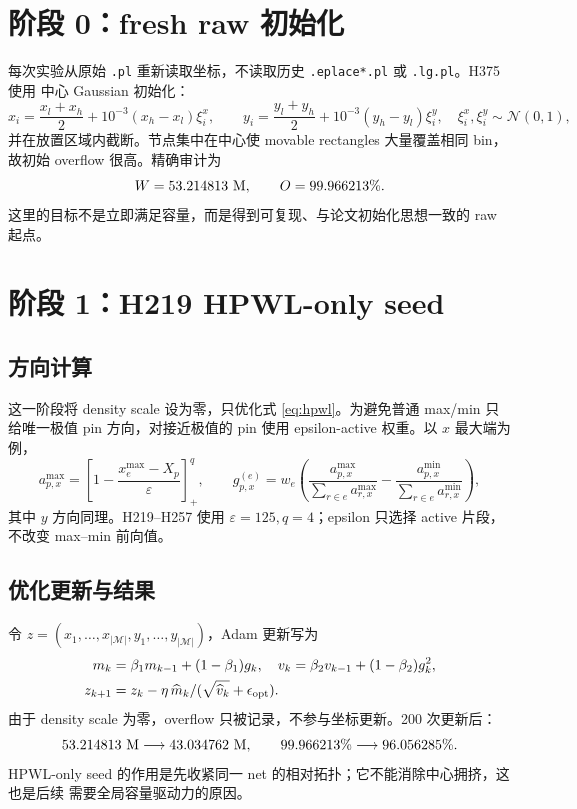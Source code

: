 \documentclass[UTF8,11pt,a4paper]{ctexart}
\newcommand{\mov}{\mathcal{M}}
\newcommand{\clip}[1]{\left[#1\right]_+}
\begin{document}
\section{阶段 0：fresh raw 初始化}

每次实验从原始 \texttt{.pl} 重新读取坐标，不读取历史 \texttt{.eplace*.pl} 或
\texttt{.lg.pl}。H375 使用
中心 Gaussian 初始化：
\begin{equation}
 x_i=\frac{x_l+x_h}{2}+10^{-3}(x_h-x_l)\xi_i^x,
 \qquad
 y_i=\frac{y_l+y_h}{2}+10^{-3}(y_h-y_l)\xi_i^y,
 \quad \xi_i^x,\xi_i^y\sim\mathcal{N}(0,1),
 \label{eq:init}
\end{equation}
并在放置区域内截断。节点集中在中心使 movable rectangles 大量覆盖相同 bin，故初始
overflow 很高。精确审计为
\[
 W=53.214813\ {\rm M},\qquad O=99.966213\%.
\]
这里的目标不是立即满足容量，而是得到可复现、与论文初始化思想一致的 raw 起点。

\section{阶段 1：H219 HPWL-only seed}

\subsection{方向计算}
这一阶段将 density scale 设为零，只优化式 \eqref{eq:hpwl}。为避免普通 max/min 只
给唯一极值 pin 方向，对接近极值的 pin 使用 epsilon-active 权重。以 $x$ 最大端为例，
\begin{equation}
 a_{p,x}^{\max}=\clip{1-\frac{x_e^{\max}-X_p}{\varepsilon}}^q,
 \qquad
 g_{p,x}^{(e)}=w_e\left(
 \frac{a_{p,x}^{\max}}{\sum_{r\in e}a_{r,x}^{\max}}-
 \frac{a_{p,x}^{\min}}{\sum_{r\in e}a_{r,x}^{\min}}\right),
 \label{eq:epsactive}
\end{equation}
其中 $y$ 方向同理。H219--H257 使用 $\varepsilon=125,q=4$；epsilon 只选择
active 片段，不改变 max--min 前向值。

\subsection{优化更新与结果}
令 $z=(x_1,\ldots,x_{|\mov|},y_1,\ldots,y_{|\mov|})$，Adam 更新写为
\begin{align}
 m_k&=\beta_1m_{k-1}+(1-\beta_1)g_k,\quad
 v_k=\beta_2v_{k-1}+(1-\beta_2)g_k^2,\\
 z_{k+1}&=z_k-\eta\,\widehat m_k/(\sqrt{\widehat v_k}+\epsilon_{\rm opt}).
 \label{eq:adam}
\end{align}
由于 density scale 为零，overflow 只被记录，不参与坐标更新。200 次更新后：
\begin{equation}
 53.214813\ {\rm M}\longrightarrow43.034762\ {\rm M},
 \qquad
 99.966213\%\longrightarrow96.056285\%.
 \label{eq:seedresult}
\end{equation}
HPWL-only seed 的作用是先收紧同一 net 的相对拓扑；它不能消除中心拥挤，这也是后续
需要全局容量驱动力的原因。
\end{document}
